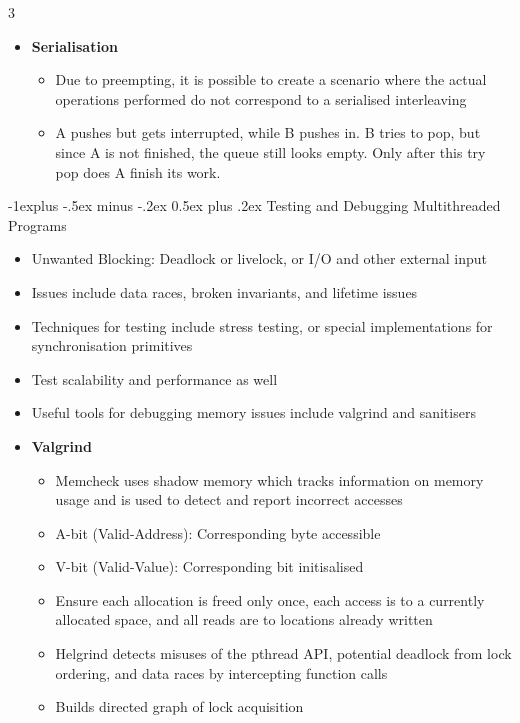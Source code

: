 \documentclass[10pt, landscape]{article}
\makeatletter
\renewcommand{\section}{\@startsection{section}{1}{0mm}%
                                {-1ex plus -.5ex minus -.2ex}%
                                {0.5ex plus .2ex}%
                                {\normalfont\large\bfseries}}
\renewcommand{\section}{\@startsection{section}{2}{0mm}%
                                {-1explus -.5ex minus -.2ex}%
                                {0.5ex plus .2ex}%
                                {\normalfont\normalsize\bfseries}}
\makeatother
\begin{document}
\begin{multicols*}{3}
\begin{itemize}
\begin{itemize}
    \end{itemize}
    \item \textbf{Serialisation}
    \begin{itemize}
        \item Due to preempting, it is possible to create a scenario where the actual operations performed do not correspond to a serialised interleaving
        \item A pushes but gets interrupted, while B pushes in. B tries to pop, but since A is not finished, the queue still looks empty. Only after this try pop does A finish its work.
    \end{itemize}
\end{itemize}

\section{Testing and Debugging Multithreaded Programs}
\begin{itemize}
    \item Unwanted Blocking: Deadlock or livelock, or I/O and other external input
    \item Issues include data races, broken invariants, and lifetime issues
    \item Techniques for testing include stress testing, or special implementations for synchronisation primitives
    \item Test scalability and performance as well
    \item Useful tools for debugging memory issues include valgrind and sanitisers
    \item \textbf{Valgrind}
    \begin{itemize}
        \item Memcheck uses shadow memory which tracks information on memory usage and is used to detect and report incorrect accesses
        \item A-bit (Valid-Address): Corresponding byte accessible
        \item V-bit (Valid-Value): Corresponding bit initisalised
        \item Ensure each allocation is freed only once, each access is to a currently allocated space, and all reads are to locations already written
        \item Helgrind detects misuses of the pthread API, potential deadlock from lock ordering, and data races by intercepting function calls
        \item Builds directed graph of lock acquisition

\end{itemize}
\end{itemize}
\end{multicols*}
\end{document}
